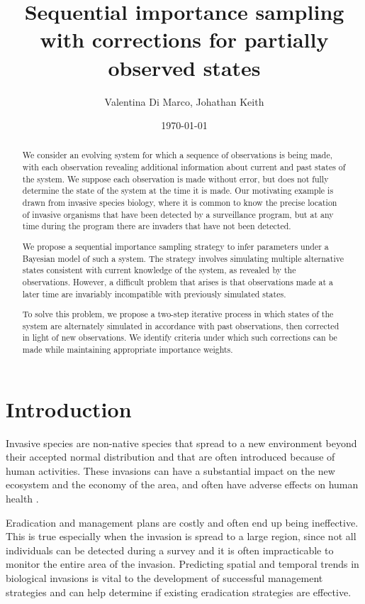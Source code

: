 \documentclass[11pt,a4paper]{article}
\title{Sequential importance sampling \\ with corrections for partially observed states}
\author{Valentina Di Marco, Johathan Keith}
\date{\today}
\begin{document}
 \maketitle



\begin{abstract}
We consider an evolving system for which a sequence of observations is being made, with each observation revealing additional information about current and past states of the system. We suppose each observation is made without error, but does not fully determine the state of the system at the time it is made. Our motivating example is drawn from invasive species biology, where it is common to know the precise location of invasive organisms that have been detected by a surveillance program, but at any time during the program there are invaders that have not been detected.

We propose a sequential importance sampling strategy to infer parameters under a Bayesian model of such a system. The strategy involves simulating multiple alternative states consistent with current knowledge of the system, as revealed by the observations. However, a difficult problem that arises is that observations made at a later time are invariably incompatible with previously simulated states.

To solve this problem, we propose a two-step iterative process in which states of the system are alternately simulated in accordance with past observations, then corrected in light of new observations. We identify criteria under which such corrections can be made while maintaining appropriate importance weights.
\end{abstract}


\section{Introduction}

Invasive species are non-native species that spread to a new environment beyond their accepted normal distribution and that are often introduced because of human activities. These invasions can have a substantial impact on the new ecosystem and the economy of the area, and often have adverse effects on human health \cite{Mack}. 

Eradication and management plans are costly and often end up being ineffective. This is true especially when the invasion is spread to a large region, since not all individuals can be detected during a survey and it is often impracticable to monitor the entire area of the invasion. Predicting spatial and temporal trends in biological invasions is vital to the development of successful management strategies and can help determine if existing eradication strategies are effective.
\end{document}
